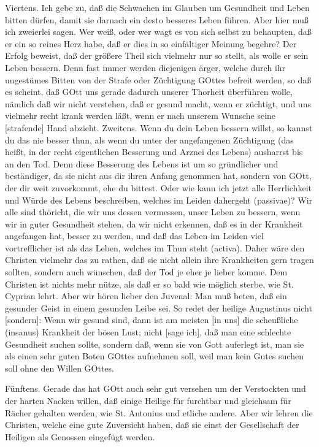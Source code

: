 Viertens. Ich gebe zu, daß die Schwachen im Glauben um Gesundheit und Leben bitten dürfen, damit sie darnach ein desto besseres Leben führen. Aber hier muß ich zweierlei sagen. Wer weiß, oder wer wagt es von sich selbst zu behaupten, daß er ein so reines Herz habe, daß er dies in so einfältiger Meinung begehre? Der Erfolg beweist, daß der größere Theil sich vielmehr nur so stellt, als wolle er sein Leben bessern. Denn fast immer werden diejenigen ärger, welche durch ihr ungestümes Bitten von der Strafe oder Züchtigung GOttes befreit werden, so daß es scheint, daß GOtt uns gerade dadurch unserer Thorheit überführen wolle, nämlich daß wir nicht verstehen, daß er gesund macht, wenn er züchtigt, und uns vielmehr recht krank werden läßt, wenn er nach unserem Wunsche seine [strafende] Hand abzieht. Zweitens. Wenn du dein Leben bessern willst, so kannst du das nie besser thun, als wenn du unter der angefangenen Züchtigung (das heißt, in der recht eigentlichen Besserung und Arznei des Lebens) ausharrst bis an den Tod. Denn diese Besserung des Lebens ist um so gründlicher und beständiger, da sie nicht aus dir ihren Anfang genommen hat, sondern von
GOtt, der dir weit zuvorkommt, ehe du bittest. Oder wie kann ich jetzt alle Herrlichkeit und Würde des Lebens beschreiben, welches im Leiden dahergeht (passivae)? Wir alle sind thöricht, die wir uns dessen vermessen, unser Leben zu bessern, wenn wir in guter Gesundheit stehen, da wir nicht erkennen, daß es in der Krankheit angefangen hat, besser zu werden, und daß das Leben im Leiden viel vortrefflicher ist als das Leben, welches im Thun steht (activa). Daher wäre den Christen vielmehr das zu rathen, daß sie nicht allein ihre Krankheiten gern tragen sollten, sondern auch wünschen, daß der Tod je eher je lieber komme. Dem Christen ist nichts mehr nütze, als daß er so bald wie möglich sterbe, wie St. Cyprian lehrt. Aber wir hören lieber den Juvenal: Man muß beten, daß ein gesunder Geist in einem gesunden Leibe sei. So redet der heilige Augustinus nicht [sondern]: Wenn wir gesund sind, dann ist am meisten [in uns] die scheußliche (insanus) Krankheit der bösen Lust; nicht [sage ich], daß man eine schlechte Gesundheit suchen sollte, sondern daß, wenn sie von Gott auferlegt ist, man sie als einen sehr guten Boten GOttes aufnehmen soll, weil man kein Gutes suchen soll ohne den Willen GOttes.

Fünftens. Gerade das hat GOtt auch sehr gut versehen um der Verstockten und der harten Nacken willen, daß einige Heilige für furchtbar und gleichsam für Rächer gehalten werden, wie St. Antonius und etliche andere. Aber wir lehren die Christen, welche eine gute Zuversicht haben, daß sie einst der Gesellschaft der Heiligen als Genossen eingefügt werden.


